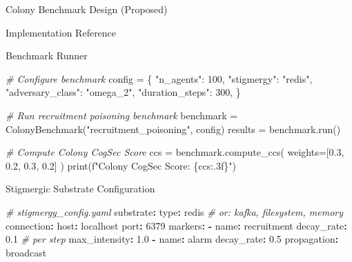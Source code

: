 \documentclass[
  ignorenonframetext,
]{beamer}
\newenvironment{Shaded}{}{}
\newcommand{\AttributeTok}[1]{\textcolor[rgb]{0.49,0.56,0.16}{#1}}
\newcommand{\BuiltInTok}[1]{\textcolor[rgb]{0.00,0.50,0.00}{#1}}
\newcommand{\CommentTok}[1]{\textcolor[rgb]{0.38,0.63,0.69}{\textit{#1}}}
\newcommand{\DecValTok}[1]{\textcolor[rgb]{0.25,0.63,0.44}{#1}}
\newcommand{\FloatTok}[1]{\textcolor[rgb]{0.25,0.63,0.44}{#1}}
\newcommand{\FunctionTok}[1]{\textcolor[rgb]{0.02,0.16,0.49}{#1}}
\newcommand{\KeywordTok}[1]{\textcolor[rgb]{0.00,0.44,0.13}{\textbf{#1}}}
\newcommand{\NormalTok}[1]{#1}
\newcommand{\OperatorTok}[1]{\textcolor[rgb]{0.40,0.40,0.40}{#1}}
\newcommand{\SpecialCharTok}[1]{\textcolor[rgb]{0.25,0.44,0.63}{#1}}
\newcommand{\SpecialStringTok}[1]{\textcolor[rgb]{0.73,0.40,0.53}{#1}}
\newcommand{\StringTok}[1]{\textcolor[rgb]{0.25,0.44,0.63}{#1}}
\begin{document}
\begin{frame}[fragile]{Colony Benchmark Design (Proposed)}
\begin{block}{Implementation Reference}
\begin{block}{Benchmark Runner}
\begin{Shaded}
\begin{Highlighting}[]
\CommentTok{\# Configure benchmark}
\NormalTok{config }\OperatorTok{=}\NormalTok{ \{}
    \StringTok{"n\_agents"}\NormalTok{: }\DecValTok{100}\NormalTok{,}
    \StringTok{"stigmergy"}\NormalTok{: }\StringTok{"redis"}\NormalTok{,}
    \StringTok{"adversary\_class"}\NormalTok{: }\StringTok{"omega\_2"}\NormalTok{,}
    \StringTok{"duration\_steps"}\NormalTok{: }\DecValTok{300}\NormalTok{,}
\NormalTok{\}}

\CommentTok{\# Run recruitment poisoning benchmark}
\NormalTok{benchmark }\OperatorTok{=}\NormalTok{ ColonyBenchmark(}\StringTok{"recruitment\_poisoning"}\NormalTok{, config)}
\NormalTok{results }\OperatorTok{=}\NormalTok{ benchmark.run()}

\CommentTok{\# Compute Colony CogSec Score}
\NormalTok{ccs }\OperatorTok{=}\NormalTok{ benchmark.compute\_ccs(}
\NormalTok{    weights}\OperatorTok{=}\NormalTok{[}\FloatTok{0.3}\NormalTok{, }\FloatTok{0.2}\NormalTok{, }\FloatTok{0.3}\NormalTok{, }\FloatTok{0.2}\NormalTok{]}
\NormalTok{)}
\BuiltInTok{print}\NormalTok{(}\SpecialStringTok{f"Colony CogSec Score: }\SpecialCharTok{\{}\NormalTok{ccs}\SpecialCharTok{:.3f\}}\SpecialStringTok{"}\NormalTok{)}
\end{Highlighting}
\end{Shaded}
\end{block}

\begin{block}{Stigmergic Substrate Configuration}
\protect{}\label{stigmergic-substrate-configuration}
\begin{Shaded}
\begin{Highlighting}[]
\CommentTok{\# stigmergy\_config.yaml}
\FunctionTok{substrate}\KeywordTok{:}
\AttributeTok{  }\FunctionTok{type}\KeywordTok{:}\AttributeTok{ redis}\CommentTok{  \# or: kafka, filesystem, memory}
\AttributeTok{  }\FunctionTok{connection}\KeywordTok{:}
\AttributeTok{    }\FunctionTok{host}\KeywordTok{:}\AttributeTok{ localhost}
\AttributeTok{    }\FunctionTok{port}\KeywordTok{:}\AttributeTok{ }\DecValTok{6379}
\AttributeTok{  }
\AttributeTok{  }\FunctionTok{markers}\KeywordTok{:}
\AttributeTok{    }\KeywordTok{{-}}\AttributeTok{ }\FunctionTok{name}\KeywordTok{:}\AttributeTok{ recruitment}
\AttributeTok{      }\FunctionTok{decay\_rate}\KeywordTok{:}\AttributeTok{ }\FloatTok{0.1}\CommentTok{  \# per step}
\AttributeTok{      }\FunctionTok{max\_intensity}\KeywordTok{:}\AttributeTok{ }\FloatTok{1.0}
\AttributeTok{    }\KeywordTok{{-}}\AttributeTok{ }\FunctionTok{name}\KeywordTok{:}\AttributeTok{ alarm}
\AttributeTok{      }\FunctionTok{decay\_rate}\KeywordTok{:}\AttributeTok{ }\FloatTok{0.5}
\AttributeTok{      }\FunctionTok{propagation}\KeywordTok{:}\AttributeTok{ broadcast}


\end{Highlighting}
\end{Shaded}
\end{block}
\end{block}
\end{frame}
\end{document}
